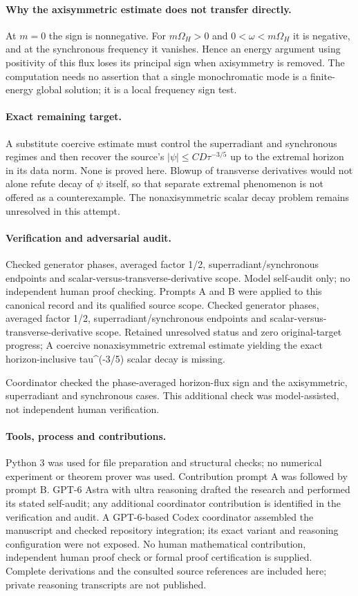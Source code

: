 \documentclass[11pt]{article}
\begin{document}
\paragraph{Why the axisymmetric estimate does not transfer directly.} At $m=0$ the sign is nonnegative. For $m\Omega_H>0$ and $0<\omega<m\Omega_H$ it is negative, and at the synchronous frequency it vanishes. Hence an energy argument using positivity of this flux loses its principal sign when axisymmetry is removed. The computation needs no assertion that a single monochromatic mode is a finite-energy global solution; it is a local frequency sign test.

\paragraph{Exact remaining target.} A substitute coercive estimate must control the superradiant and synchronous regimes and then recover the source's $|\psi|\leq CD\tau^{-3/5}$ up to the extremal horizon in its data norm. None is proved here. Blowup of transverse derivatives would not alone refute decay of $\psi$ itself, so that separate extremal phenomenon is not offered as a counterexample. The nonaxisymmetric scalar decay problem remains unresolved in this attempt.

\paragraph{Verification and adversarial audit.}
Checked generator phases, averaged factor 1/2, superradiant/synchronous endpoints and scalar-versus-transverse-derivative scope. Model self-audit only; no independent human proof checking. Prompts A and B were applied to this canonical record and its qualified source scope. Checked generator phases, averaged factor 1/2, superradiant/synchronous endpoints and scalar-versus-transverse-derivative scope. Retained unresolved status and zero original-target progress; A coercive nonaxisymmetric extremal estimate yielding the exact horizon-inclusive tau\textasciicircum{}(-3/5) scalar decay is missing.

Coordinator checked the phase-averaged horizon-flux sign and the axisymmetric, superradiant and synchronous cases. This additional check was model-assisted, not independent human verification.

\paragraph{Tools, process and contributions.}
Python 3 was used for file preparation and structural checks; no numerical experiment or theorem prover was used. Contribution prompt A was followed by prompt B. GPT-6 Astra with ultra reasoning drafted the research and performed its stated self-audit; any additional coordinator contribution is identified in the verification and audit. A GPT-6-based Codex coordinator assembled the manuscript and checked repository integration; its exact variant and reasoning configuration were not exposed. No human mathematical contribution, independent human proof check or formal proof certification is supplied. Complete derivations and the consulted source references are included here; private reasoning transcripts are not published.
\end{document}
